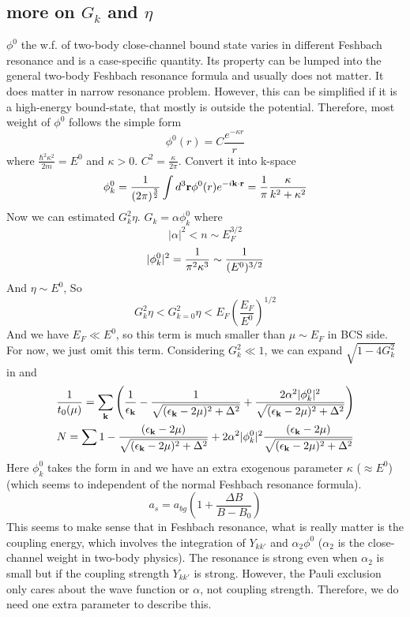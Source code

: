 \subsection{more on $G_{k}$ and $\eta$}
$\phi^{0}$ the w.f. of two-body close-channel bound state varies in different Feshbach resonance and is a case-specific quantity.  Its property can be lumped into the general two-body Feshbach resonance formula and usually does not matter.  It does matter in narrow resonance problem.  However, this can be simplified if it is a high-energy bound-state, that mostly is outside the potential.  Therefore, most weight of $\phi^{0}$ follows the simple form 
\[
\phi^{0}(r)=C\frac{e^{-\kappa{r}}}{r}
\]
 where $\frac{\hbar^{2}\kappa^{2}}{2m}=E^{0}$ and $\kappa>0$.  $C^{2}=\frac{\kappa}{2\pi}$.  Convert it into k-space
 \begin{equation}\label{eq:20101011:phi}
\phi^{0}_k=\frac{1}{(2\pi)^{\frac32}}\int{d^{3}\ensuremath{\mathbf{r}}\phi^{0}(r)e^{-i\ensuremath{\mathbf{k}}\cdot\ensuremath{\mathbf{r}}}}=\frac{1}{\pi}\frac{\kappa}{k^{2}+\kappa^{2}}
\end{equation}
Now we can estimated $G_{k}^{2}\eta$. $G_{k}=\alpha\phi^{0}_{k}$ where 
\[|\alpha|^{2}<n\sim{E_{F}^{3/2}}\]
\[
\lvert{\phi^{0}_{k}}\rvert^{2}=\frac{1}{\pi^{2}\kappa^{3}}\sim\frac{1}{(E^{0})^{3/2}}
\]
And $\eta\sim{E^{0}}$, So 
\[
G_{k}^{2}\eta<G_{k=0}^{2}\eta<E_{F}(\frac{E_{F}}{E^{0}})^{1/2}
\]
And we have $E_{F}\ll{E^{0}}$, so this term is much smaller than $\mu\sim{E_{F}}$ in BCS side. For now, we just omit this term.  Considering $G_{k}^{2}\ll1$, we can expand $\sqrt{1-4G_{k}^{2}}$ in  and  
\begin{gather}
\frac{1}{{t_{0}}(\mu)}=\sum_{\mathbf{k}}
\left(\frac{1}{\epsilon_{\mathbf{k}}}-\frac{1}{\sqrt{{(\epsilon_{\mathbf{k}}-2\mu)^{2}+\Delta^{2}}}}
+\frac{2\alpha^{2}|\phi^{0}_{k}|^{2}}{\sqrt{{(\epsilon_{\mathbf{k}}-2\mu)^{2}+\Delta^{2}}}}\right)\label{eq:20101011:gapa}
\\
N=\sum{1-\frac{(\epsilon_{\ensuremath{\mathbf{k}}}-2\mu)}{{\sqrt{{(\epsilon_{\ensuremath{\mathbf{k}}}-2\mu)^{2}+\Delta^{2}}}}}
+2\alpha^{2}|\phi^{0}_{k}|^{2}\frac{(\epsilon_{\ensuremath{\mathbf{k}}}-2\mu)}{{\sqrt{{(\epsilon_{\ensuremath{\mathbf{k}}}-2\mu)^{2}+\Delta^{2}}}}}}
\label{eq:20101011:gapb}
\end{gather}
Here $\phi^{0}_{k}$ takes the form in  and we have an extra exogenous parameter $\kappa$ ($\approx{}E^{0}$) (which seems to independent of the normal Feshbach resonance formula).
\begin{equation}
a_{s}=a_{bg}(1+\frac{\Delta{B}}{B-B_{0}})
\end{equation}
This seems to make sense that in Feshbach resonance, what is really matter is the coupling energy, which involves  the integration of $Y_{kk'}$ and $\alpha_{2}\phi^{0}$ ($\alpha_{2}$ is the close-channel weight in two-body physics).  The resonance is strong even when $\alpha_{2}$ is small but if the coupling strength $Y_{kk'}$ is strong.  However, the Pauli exclusion only cares about the wave function or $\alpha$, not coupling strength.   Therefore, we do need one extra parameter to describe this.  

